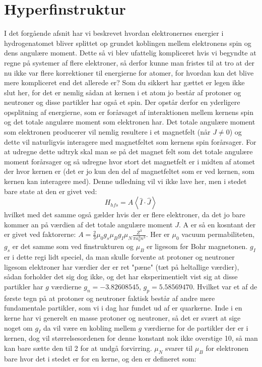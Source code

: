 \documentclass[../../Atom-ogMolekylefysik.tex]{subfiles}
\begin{document}
\section{Hyperfinstruktur}
I det forgående afsnit har vi beskrevet hvordan elektronernes energier i hydrogenatomet bliver splittet op grundet koblingen mellem elektronens spin og dens angulære moment. Dette så vi blev ufattelig kompliceret hvis vi begyndte at regne på systemer af flere elektroner, så derfor kunne man fristes til at tro at der nu ikke var flere korrektioner til energierne for atomer, for hvordan kan det blive mere kompliceret end det allerede er? Som du sikkert har gættet er legen ikke slut her, for det er nemlig sådan at kernen i et atom jo består af protoner og neutroner og disse partikler har også et spin. Der opstår derfor en yderligere opsplitning af energierne, som er forårsaget af interaktionen mellem kernens spin og det totale angulære moment som elektronen har. Det totale angulære moment som elektronen producerer vil nemlig resultere i et magnetfelt (når $J\neq0$) og dette vil naturligvis interagere med magnetfeltet som kernens spin forårsager. 
For at udregne dette udtryk skal man se på det magnet felt som det totale angulære moment forårsager og så udregne hvor stort det magnetfelt er i midten af atomet der hvor kernen er (det er jo kun den del af magnetfeltet som er ved kernen, som kernen kan interagere med). Denne udledning vil vi ikke lave her, men i stedet bare state at den er givet ved:
\begin{equation}
    H_{hfs}=A\left<\hat{I}\cdot\hat{J}\right>
\end{equation}
hvilket med det samme også gælder hvis der er flere elektroner, da det jo bare kommer an på værdien af det totale angulære moment $J$.
A er så en kosntant der er givet ved faktorerne: $A=\frac{2}{3}\mu_0g_s\mu_Bg_I\mu_N\frac{Z^3}{\pi a_0^3n^3}$. Her er $\mu_0$ vacuum permabiliteten, $g_s$ er det samme som ved finstrukturen og $\mu_B$ er ligesom før Bohr magnetonen. $g_I$ er i dette regi lidt speciel, da man skulle forvente at protoner og neutroner ligesom elektroner har værdier der er ret "pæne" (tæt på heltallige værdier), sådan forholder det sig dog ikke, og det har eksperimentielt vist sig at disse partikler har $g$ værdierne $g_n=- 3.82608545$, $g_p=5.58569470$. Hvilket var et af de første tegn på at protoner og neutroner faktisk består af andre mere fundamentale partikler, som vi i dag har fundet ud af er quarkerne. Inde i en kerne har vi generelt en masse protoner og neutroner, så det er svært at sige noget om $g_I$ da vil være en kobling mellem $g$ værdierne for de partikler der er i kernen, dog vil størrelsesordenen for denne konstant nok ikke overstige 10, så man kan bare sætte den til 2 for at undgå forvirring. $\mu_N$ svarer til $\mu_B$ for elektronen bare hvor det i stedet er for en kerne, og den er defineret som:
\end{document}
